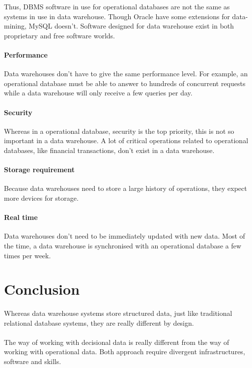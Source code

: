 \documentclass[a4paper,12pt]{article}
\begin{document}
    Thus, DBMS software in use for operational databases are not the same as
systems in use in data warehouse. Though Oracle have some extensions for
data-mining, MySQL doesn't. Software designed for data warehouse exist in
both proprietary and free software worlds. 

    \paragraph{Performance}
    Data warehouses don't have to give the same performance level. For example,
an operational database must be able to answer to hundreds of concurrent
requests while a data warehouse will only receive a few queries per day.

    \paragraph{Security}
    Whereas in a operational database, security is the top priority, this is
not so important in a data warehouse. A lot of critical operations related
to operational databases, like financial transactions, don't exist in a data
warehouse.

    \paragraph{Storage requirement}
    Because data warehouses need to store a large history of operations, they
expect more devices for storage.

    \paragraph{Real time}
    Data warehouses don't need to be immediately updated with new data. Most of
the time, a data warehouse is synchronised with an operational database a few
times per week.

\newpage

\section{Conclusion}
    \paragraph{}
    Whereas data warehouse systems store structured data, just like traditional
relational database systems, they are really different by design.

    \paragraph{}
    The way of working with decisional data is really different from the way of
working with operational data. Both approach require divergent infrastructures,
software and skills.
\end{document}
